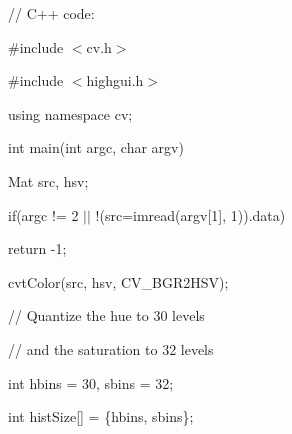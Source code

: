 {\ttfamily }

{\ttfamily }

{\ttfamily // C++ code\+:}

{\ttfamily }

{\ttfamily }

{\ttfamily \#include $<$cv.\+h$>$}

{\ttfamily }

{\ttfamily }

{\ttfamily \#include $<$highgui.\+h$>$}

{\ttfamily }

{\ttfamily }

{\ttfamily using namespace cv;}

{\ttfamily }

{\ttfamily }

{\ttfamily int main(int argc, char argv)}

{\ttfamily }

{\ttfamily }

{\ttfamily Mat src, hsv;}

{\ttfamily }

{\ttfamily }

{\ttfamily if(argc != 2 $\vert$$\vert$ !(src=imread(argv\mbox{[}1\mbox{]}, 1)).data)}

{\ttfamily }

{\ttfamily }

{\ttfamily return -\/1;}

{\ttfamily }

{\ttfamily }

{\ttfamily cvt\+Color(src, hsv, C\+V\+\_\+\+B\+G\+R2\+H\+S\+V);}

{\ttfamily }

{\ttfamily }

{\ttfamily // Quantize the hue to 30 levels}

{\ttfamily }

{\ttfamily }

{\ttfamily // and the saturation to 32 levels}

{\ttfamily }

{\ttfamily }

{\ttfamily int hbins = 30, sbins = 32;}

{\ttfamily }

{\ttfamily }

{\ttfamily int hist\+Size\mbox{[}\mbox{]} = \{hbins, sbins\};}

{\ttfamily }

{\ttfamily }

